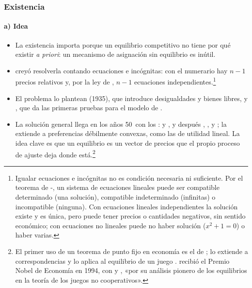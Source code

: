 \documentclass[11pt]{article}
\begin{document}
\subsubsection{Existencia}\label{sec:existencia}

\paragraph{a) Idea}

\begin{itemize}
\item La existencia importa porque un equilibrio competitivo no tiene por qué existir \emph{a priori}: un mecanismo de asignación sin equilibrio es inútil.
\item {} creyó resolverla contando ecuaciones e incógnitas: con el numerario hay $n-1$ precios relativos y, por la ley de , $n-1$ ecuaciones independientes.\footnote{Igualar ecuaciones e incógnitas no es condición necesaria ni suficiente. Por el teorema de -, un sistema de ecuaciones lineales puede ser compatible determinado (una solución), compatible indeterminado (infinitas) o incompatible (ninguna). Con ecuaciones lineales independientes la solución existe y es única, pero puede tener precios o cantidades negativos, sin sentido económico; con ecuaciones no lineales puede no haber solución ($x^2+1=0$) o haber varias.}
\item El problema lo plantean  (1935), que introduce desigualdades y bienes libres, y \textcite{Wald1936Gleichungssysteme}, que da las primeras pruebas para el modelo de .
\item La solución general llega en los años 50~con los : \textcite{ArrowDebreu1954Existence} y \textcite{McKenzie1954Equilibrium}, y después \textcite{Gale1955Law}, \textcite{Nikaido1956Classical}, \textcite{McKenzie1959Existence} y \textcite{Debreu1959Theory}; \textcite{Gale1976Linear} la extiende a preferencias débilmente convexas, como las de utilidad lineal. La idea clave es que un equilibrio es un vector de precios que el propio proceso de ajuste deja donde está.\footnote{El primer uso de un teorema de punto fijo en economía es el de \textcite{VonNeumann1937Gleichungssystem}; \textcite{Kakutani1941Generalization} lo extiende a correspondencias y \textcite{Nash1950Equilibrium} lo aplica al equilibrio de un juego .  recibió el Premio Nobel de Economía en 1994, con  y , «por su análisis pionero de los equilibrios en la teoría de los juegos no cooperativos»\nocite{Nobel1994Nash}.}
\end{itemize}
\end{document}
